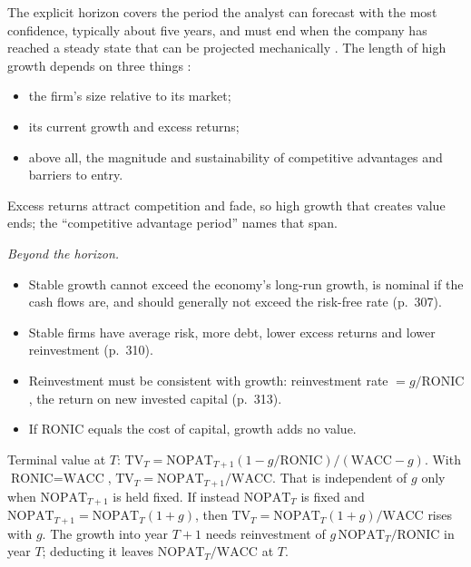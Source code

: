 \begin{qfmethod}\label{meth:forecast-horizon-steady-state}
 The explicit horizon covers the period the analyst can forecast with the most confidence, typically about five years, and must end when the company has reached a steady state that can be projected mechanically \citep[p.~501]{financial-statement-analysis-2009}. The length of high growth depends on three things \citep[pp.~308--309]{investment-valuation-2012}:
\begin{itemize}
\item the firm's size relative to its market;
\item its current growth and excess returns;
\item above all, the magnitude and sustainability of competitive advantages and barriers to entry.
\end{itemize}
Excess returns attract competition and fade, so high growth that creates value ends; the ``competitive advantage period'' names that span.

\emph{Beyond the horizon.}
\begin{itemize}
\item Stable growth cannot exceed the economy's long-run growth, is nominal if the cash flows are, and should generally not exceed the risk-free rate (p.~307).
\item Stable firms have average risk, more debt, lower excess returns and lower reinvestment (p.~310).
\item Reinvestment must be consistent with growth: reinvestment rate $=g/\text{RONIC}$, the return on new invested capital (p.~313).
\item If RONIC equals the cost of capital, growth adds no value.
\end{itemize}

 Terminal value at $T$: $\text{TV}_T=\text{NOPAT}_{T+1}(1-g/\text{RONIC})/(\text{WACC}-g)$. With $\text{RONIC}=\text{WACC}$, $\text{TV}_T=\text{NOPAT}_{T+1}/\text{WACC}$. That is independent of $g$ only when $\text{NOPAT}_{T+1}$ is held fixed. If instead $\text{NOPAT}_T$ is fixed and $\text{NOPAT}_{T+1}=\text{NOPAT}_T(1+g)$, then $\text{TV}_T=\text{NOPAT}_T(1+g)/\text{WACC}$ rises with $g$. The growth into year $T+1$ needs reinvestment of $g\,\text{NOPAT}_T/\text{RONIC}$ in year $T$; deducting it leaves $\text{NOPAT}_T/\text{WACC}$ at $T$.


\end{qfmethod}
